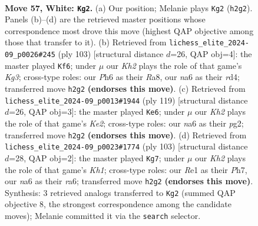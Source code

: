 \documentclass[11pt]{article}
\begin{document}
\clearpage

\begin{figure}[p]\centering
\begin{subfigure}{0.46\textwidth}\centering
\resizebox{\linewidth}{!}{%
\newchessgame
\chessboard[
  setfen={1k6/1p5p/n5pP/p4p2/5P2/r7/3R3K/4R3 w - - 1 57},
  showmover=false,
  pgfstyle=straightmove, color=movearrow, markmove={h2-g2}
]}
\caption{}
\end{subfigure}\hfill
\begin{subfigure}{0.46\textwidth}\centering
\resizebox{\linewidth}{!}{%
\newchessgame
\chessboard[
  setfen={r7/8/6k1/8/p1PR4/Pp1K2P1/1P3P2/8 b - - 0 52},
  showmover=false,
  pgfstyle=straightmove, color=movearrow, markmove={g6-f6}
]}
\caption{}
\end{subfigure}
\\[4pt]
\begin{subfigure}{0.46\textwidth}\centering
\resizebox{\linewidth}{!}{%
\newchessgame
\chessboard[
  setfen={8/r3k1p1/7p/1R2P2P/5P2/5K2/6P1/8 b - - 0 60},
  showmover=false,
  pgfstyle=straightmove, color=movearrow, markmove={e7-e6}
]}
\caption{}
\end{subfigure}\hfill
\begin{subfigure}{0.46\textwidth}\centering
\resizebox{\linewidth}{!}{%
\newchessgame
\chessboard[
  setfen={5r1k/7p/R7/P2Ppp2/1P6/5P1P/6P1/7K b - - 0 52},
  showmover=false,
  pgfstyle=straightmove, color=movearrow, markmove={h8-g7}
]}
\caption{}
\end{subfigure}
\caption{\textbf{Move 57, White: \texttt{Kg2}.} (a) Our position; Melanie plays \texttt{Kg2} (\texttt{h2g2}). Panels (b)--(d) are the retrieved master positions whose correspondence most drove this move (highest QAP objective among those that transfer to it). (b) Retrieved from \texttt{lichess\_elite\_2024-09\_p0026\#245} (ply 103) [structural distance $d$=26, QAP obj=4]: the master played \texttt{Kf6}; under $\mu$ our \emph{Kh2} plays the role of that game's \emph{Kg3}; cross-type roles: our \emph{P}h6 as their \emph{R}a8, our \emph{n}a6 as their \emph{r}d4; transferred move \texttt{h2g2} \textbf{(endorses this move)}. (c) Retrieved from \texttt{lichess\_elite\_2024-09\_p0013\#1944} (ply 119) [structural distance $d$=26, QAP obj=3]: the master played \texttt{Ke6}; under $\mu$ our \emph{Kh2} plays the role of that game's \emph{Ke2}; cross-type roles: our \emph{n}a6 as their \emph{p}g2; transferred move \texttt{h2g2} \textbf{(endorses this move)}. (d) Retrieved from \texttt{lichess\_elite\_2024-09\_p0023\#1774} (ply 103) [structural distance $d$=28, QAP obj=2]: the master played \texttt{Kg7}; under $\mu$ our \emph{Kh2} plays the role of that game's \emph{Kh1}; cross-type roles: our \emph{R}e1 as their \emph{P}h7, our \emph{n}a6 as their \emph{r}a6; transferred move \texttt{h2g2} \textbf{(endorses this move)}. Synthesis: 3 retrieved analogs transferred to \texttt{Kg2} (summed QAP objective 8, the strongest correspondence among the candidate moves); Melanie committed it via the \texttt{search} selector.}
\label{fig:thought-m112}
\end{figure}
\end{document}
